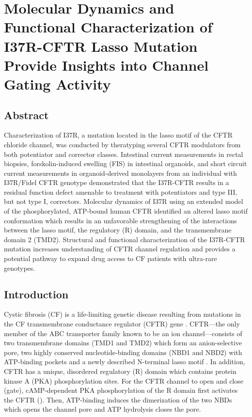 \chapter{Molecular Dynamics and Functional Characterization of I37R-CFTR Lasso Mutation Provide Insights into Channel Gating Activity}
\label{chap:I37R}
\section*{\centering Abstract} 
Characterization of I37R, a mutation located in the lasso motif of the CFTR chloride channel, was conducted by theratyping several CFTR modulators from both potentiator and corrector classes. Intestinal current measurements in rectal biopsies, forskolin-induced swelling (FIS) in intestinal organoids, and short circuit current measurements in organoid-derived monolayers from an individual with I37R/Fidel CFTR genotype demonstrated that the I37R-CFTR results in a residual function defect amenable to treatment with potentiators and type III, but not type I, correctors. Molecular dynamics of I37R using an extended model of the phosphorylated, ATP-bound human CFTR identified an altered lasso motif conformation which results in an unfavorable strengthening of the interactions between the lasso motif, the regulatory (R) domain, and the transmembrane domain 2 (TMD2). Structural and functional characterization of the I37R-CFTR mutation increases understanding of CFTR channel regulation and provides a potential pathway to expand drug access to CF patients with ultra-rare genotypes.

\section{Introduction}
Cystic fibrosis (CF) is a life-limiting genetic disease resulting from mutations in the CF transmembrane conductance regulator (CFTR) gene \cite{ratjen2015}. CFTR—the only member of the ABC transporter family known to be an ion channel—consists of two transmembrane domains (TMD1 and TMD2) which form an anion-selective pore, two highly conserved nucleotide-binding domains (NBD1 and NBD2) with ATP-binding pockets and a newly described N-terminal lasso motif \cite{hwang2013a, zhang2016a}. In addition, CFTR has a unique, disordered regulatory (R) domain which contains protein kinase A (PKA) phosphorylation sites. For the CFTR channel to open and close (gate), cAMP-dependent PKA phosphorylation of the R domain first activates the CFTR (\cite{gadsby1994}). Then, ATP-binding induces the dimerization of the two NBDs which opens the channel pore and ATP hydrolysis closes the pore.

